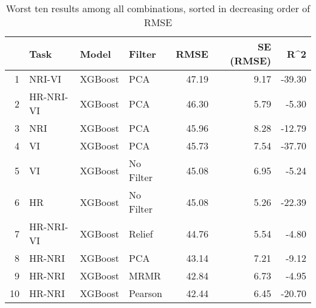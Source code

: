 \begin{table}[ht!]
\centering
\caption{Worst ten results among all combinations, sorted in decreasing order of RMSE} 
\label{tab:perf-worst-10}
\begin{tabular}{rlllrrr}
  \hline
 & Task & Model & Filter & RMSE & SE (RMSE) & R^2 \\ 
  \hline
1 & NRI-VI & XGBoost & PCA & 47.19 & 9.17 & -39.30 \\ 
  2 & HR-NRI-VI & XGBoost & PCA & 46.30 & 5.79 & -5.30 \\ 
  3 & NRI & XGBoost & PCA & 45.96 & 8.28 & -12.79 \\ 
  4 & VI & XGBoost & PCA & 45.73 & 7.54 & -37.70 \\ 
  5 & VI & XGBoost & No Filter & 45.08 & 6.95 & -5.24 \\ 
  6 & HR & XGBoost & No Filter & 45.08 & 5.26 & -22.39 \\ 
  7 & HR-NRI-VI & XGBoost & Relief & 44.76 & 5.54 & -4.80 \\ 
  8 & HR-NRI & XGBoost & PCA & 43.14 & 7.21 & -9.12 \\ 
  9 & HR-NRI & XGBoost & MRMR & 42.84 & 6.73 & -4.95 \\ 
  10 & HR-NRI & XGBoost & Pearson & 42.44 & 6.45 & -20.70 \\ 
   \hline
\end{tabular}
\end{table}
